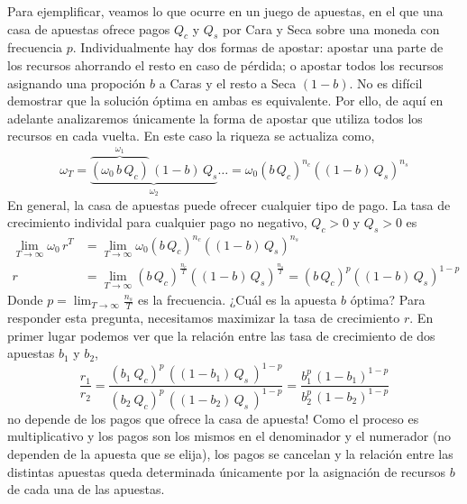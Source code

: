 \documentclass[a4paper,10pt]{book}
\theoremstyle{definition}
\begin{document}

Para ejemplificar, veamos lo que ocurre en un juego de apuestas, en el que una casa de apuestas ofrece pagos $Q_c$ y $Q_s$ por Cara y Seca sobre una moneda con frecuencia $p$.
%
Individualmente hay dos formas de apostar: apostar una parte de los recursos ahorrando el resto en caso de pérdida; o apostar todos los recursos asignando una propoci\'on $b$ a Caras y el resto a Seca $(1-b)$.
%
No es dif\'icil demostrar que la soluci\'on \'optima en ambas es equivalente.
%
Por ello, de aqu\'i en adelante analizaremos \'unicamente la forma de apostar que utiliza todos los recursos en cada vuelta.
%
En este caso la riqueza se actualiza como,
%
\begin{equation} \label{eq:kelly_paraconsistente}
\omega_T = \underbrace{\overbrace{(\omega_0 \, b \, Q_c)}^{\omega_1} \,  (1-b) \, Q_s}_{\omega_2} \dots = \omega_0 (b \, Q_c)^{n_c} ((1-b) \, Q_s )^{n_s}
\end{equation}
%
En general, la casa de apuestas puede ofrecer cualquier tipo de pago.
%
La tasa de crecimiento individal para cualquier pago no negativo, $Q_c > 0$ y $Q_s > 0$ es
%
\begin{equation}
\begin{split}
\lim_{T \rightarrow \infty } \omega_0 \, r^T &= \lim_{T \rightarrow \infty } \omega_0 (b \, Q_c)^{n_c} ((1-b) \, Q_s )^{n_s} \\
r &= \lim_{T \rightarrow \infty } (b \, Q_c)^{\frac{n_c}{T}} ((1-b) \, Q_s )^{\frac{n_s}{T}} = (b \, Q_c)^{p} ((1-b) \, Q_s )^{1-p}
\end{split}
\end{equation}
%
Donde $p = \lim_{T \rightarrow \infty} \frac{n_s}{T}$ es la frecuencia.
%
¿Cuál es la apuesta $b$ \'optima?
%
Para responder esta pregunta, necesitamos maximizar la tasa de crecimiento $r$. 
%
En primer lugar podemos ver que la relaci\'on entre las tasa de crecimiento de dos apuestas $b_1$ y $b_2$,
%
\begin{equation}
\frac{r_1}{r_2} = \frac{(b_1 \  Q_c)^{p}  \,  ((1-b_1) \, Q_s \, )^{1-p} }{(b_2 \  Q_c)^{p}  \,  ((1-b_2) \, Q_s \, )^{1-p}  } = \frac{b_1^{p}  \,  (1-b_1)^{1-p} }{b_2^{p}  \,  (1-b_2)^{1-p} }
\end{equation}
%
no depende de los pagos que ofrece la casa de apuesta!
%
Como el proceso es multiplicativo y los pagos son los mismos en el denominador y el numerador (no dependen de la apuesta que se elija), los pagos se cancelan y la relaci\'on entre las distintas apuestas queda determinada \'unicamente por la asignaci\'on de recursos $b$ de cada una de las apuestas. 
\end{document}
